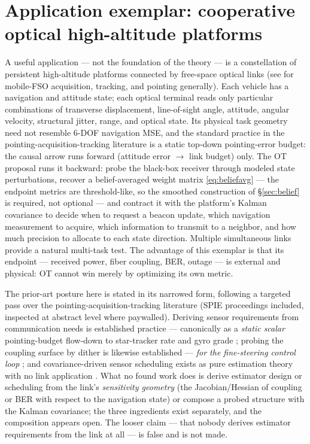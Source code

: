 \documentclass[letterpaper,onecolumn]{IEEEtran}
\theoremstyle{definition}
\theoremstyle{remark}
\begin{document}
\section{Application exemplar: cooperative optical high-altitude platforms}
\label{sec:fso}

A useful application --- not the foundation of the theory --- is a
constellation of persistent high-altitude platforms connected by free-space
optical links (see \cite{kaymak2018} for mobile-FSO acquisition, tracking,
and pointing generally). Each vehicle has a navigation and attitude
state; each optical terminal reads only particular combinations of
transverse displacement, line-of-sight angle, attitude, angular velocity,
structural jitter, range, and optical state. Its physical task geometry
need not resemble 6-DOF navigation MSE, and the standard practice in the
pointing-acquisition-tracking literature is a static top-down pointing-error
budget: the causal arrow runs forward (attitude error $\to$ link budget)
only. The OT proposal runs it backward: probe the black-box receiver through
modeled state perturbations, recover a belief-averaged weight matrix
\eqref{eq:beliefavg} --- the endpoint metrics are threshold-like, so the
smoothed construction of \S\ref{sec:belief} is required, not optional ---
and contract it with the platform's Kalman covariance to decide when to
request a beacon update, which navigation measurement to acquire, which
information to transmit to a neighbor, and how much precision to allocate to
each state direction. Multiple simultaneous links provide a natural
multi-task test. The advantage of this exemplar is that its endpoint ---
received power, fiber coupling, BER, outage --- is external and physical: OT
cannot win merely by optimizing its own metric.

The prior-art posture here is stated in its narrowed form, following a
targeted pass over the pointing-acquisition-tracking literature (SPIE
proceedings included, inspected at abstract level where paywalled).
Deriving sensor requirements from communication needs is established
practice --- canonically as a \emph{static scalar} pointing-budget
flow-down to star-tracker rate and gyro grade \cite{leeortiz2005}; probing
the coupling surface by dither is likewise established --- \emph{for the
fine-steering control loop} \cite{spgd2020}; and covariance-driven sensor
scheduling exists as pure estimation theory with no link application
\cite{alahdab2025}. What no found work does is derive estimator design or
scheduling from the link's \emph{sensitivity geometry} (the
Jacobian/Hessian of coupling or BER with respect to the navigation state)
or compose a probed structure with the Kalman covariance; the three
ingredients exist separately, and the composition appears open. The looser
claim --- that nobody derives estimator requirements from the link at all
--- is false and is not made.
\end{document}
